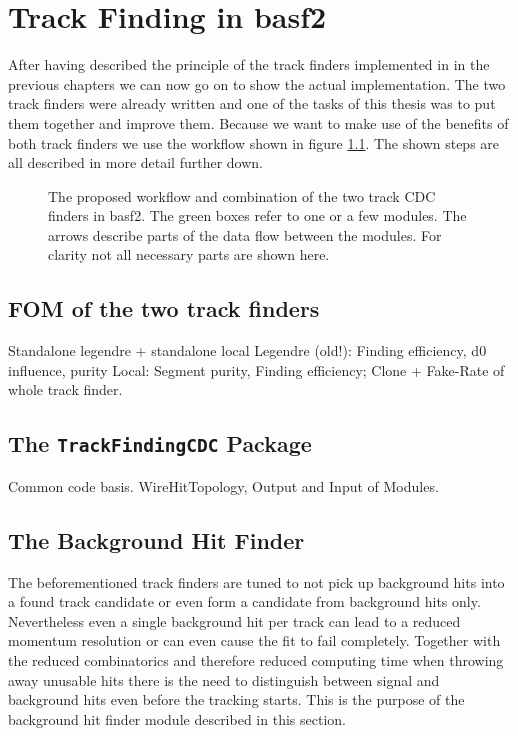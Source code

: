 \chapter{Track Finding in basf2} \label{chapter-workflow}

After having described the principle of the track finders implemented in \basf in the previous chapters we can now go on to show the actual implementation. The two track finders were already written and one of the tasks of this thesis was to put them together and improve them. Because we want to make use of the benefits of both track finders we use the workflow shown in figure \ref{fig-workflow}. The shown steps are all described in more detail further down.

\begin{figure}
 \caption[Proposed workflow in the CDC tracking]{The proposed workflow and combination of the two track CDC finders in basf2. The green boxes refer to one or a few modules. The arrows describe parts of the data flow between the modules. For clarity not all necessary parts are shown here.}
 \label{fig-workflow}
\end{figure}


\section{FOM of the two track finders}

Standalone legendre + standalone local
Legendre (old!): Finding efficiency, d0 influence, purity
Local: Segment purity, Finding efficiency; Clone + Fake-Rate of whole track finder.

\section{The \texttt{TrackFindingCDC} Package}
Common code basis. WireHitTopology, Output and Input of Modules.

\section{The Background Hit Finder}
The beforementioned track finders are tuned to not pick up background hits into a found track candidate or even form a candidate from background hits only. Nevertheless even a single background hit per track can lead to a reduced momentum resolution or can even cause the fit to fail completely. Together with the reduced combinatorics and therefore reduced computing time when throwing away unusable hits there is the need to distinguish between signal and background hits even before the tracking starts. This is the purpose of the background hit finder module described in this section.

